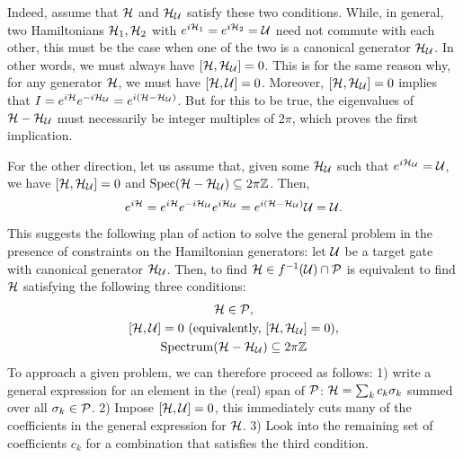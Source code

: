 Indeed, assume that $\mathcal{H}$ and $\mathcal{H}_{\mathcal{U}}$ satisfy these two conditions.
While, in general, two Hamiltonians $\mathcal{H}_1,\mathcal{H}_2$ with $e^{i\mathcal{H}_1}=e^{i\mathcal{H}_2}=\mathcal{U}$ need not commute with each other, this must be the case when one of the two is a canonical generator $\mathcal{H}_{\mathcal{U}}$. In other words, we must always have $[\mathcal{H},\mathcal{H}_{\mathcal{U}}]=0$.
This is for the same reason why, for any generator $\mathcal{H}$, we must have $[\mathcal{H},\mathcal{U}]=0$.
Moreover, $[\mathcal{H},\mathcal{H}_{\mathcal{U}}]=0$ implies that
$I=e^{i\mathcal{H}}e^{-i\mathcal{H}_{\mathcal{U}}}=e^{i(\mathcal{H}-\mathcal{H}_{\mathcal{U}})}$.
But for this to be true, the eigenvalues of $\mathcal{H}-\mathcal{H}_{\mathcal{U}}$ must necessarily be integer multiples of $2\pi$, which proves the first implication.

For the other direction, let us assume that, given some $\mathcal{H}_{\mathcal{U}}$ such that $e^{i\mathcal{H}_{\mathcal{U}}}=\mathcal{U}$, we have $[\mathcal{H},\mathcal{H}_{\mathcal{U}}]=0$ and $\operatorname{Spec}(\mathcal{H}-\mathcal{H}_{\mathcal{U}})\subseteq2\pi\mathbb{Z}$.
Then,
\begin{equation}
    e^{i\mathcal{H}} =
    e^{i\mathcal{H}} e^{-i\mathcal{H}_{\mathcal{U}}} e^{i\mathcal{H}_{\mathcal{U}}} =
    e^{i(\mathcal{H}-\mathcal{H}_{\mathcal{U}})} \mathcal{U} =
    \mathcal{U}.
\end{equation}
This suggests the following plan of action to solve the general problem in the presence of constraints on the Hamiltonian generators: let $\mathcal{U}$ be a target gate with canonical generator $\mathcal{H}_{\mathcal{U}}$. Then, to find $\mathcal{H}\in f^{-1}(\mathcal{U})\cap\mathcal{P}$ is equivalent to find $\mathcal{H}$ satisfying the following three conditions:
\begin{subequations}
\begin{gather}
    \calH\in\calP, \label{eq:3conditions_1st}\\
    [\calH,\calU]=0 \text{ (equivalently, $[\calH,\calH_{\calU}]=0$)}, \label{eq:3conditions_2nd}\\
    \on{Spectrum}(\calH-\calH_{\calU})\subseteq2\pi\ZZ \label{eq:3conditions_3rd}
\end{gather}
\label{eq:3conditions}
\end{subequations}
To approach a given problem, we can therefore proceed as follows:
1) write a general expression for an element in the (real) span of $\mathcal{P}$: $\mathcal{H}=\sum_k c_k \sigma_k$ summed over all $\sigma_k\in\mathcal{P}$.
2) Impose $[\mathcal{H},\mathcal{U}]=0$, this immediately cuts many of the coefficients in the general expression for $\mathcal{H}$.
3) Look into the remaining set of coefficients $c_k$ for a combination that satisfies the third condition.

